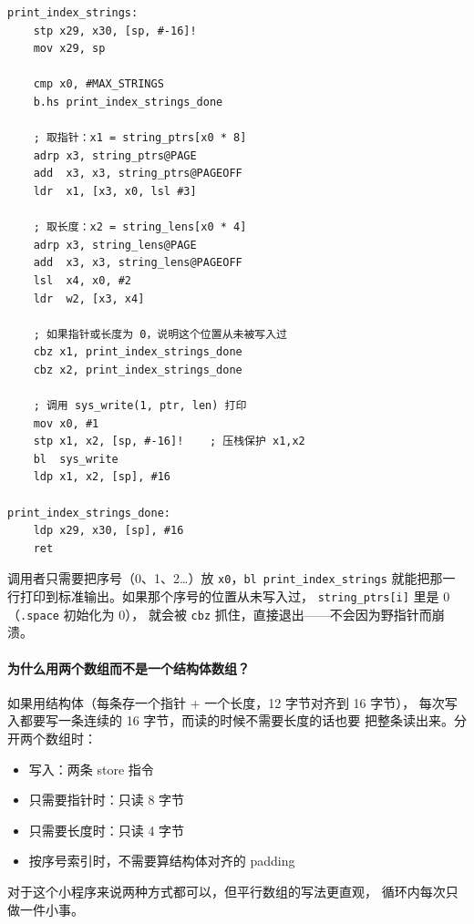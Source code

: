 \begin{lstlisting}[style=asm,caption=string\_array.s — print\_index\_strings]
print_index_strings:
    stp x29, x30, [sp, #-16]!
    mov x29, sp

    cmp x0, #MAX_STRINGS
    b.hs print_index_strings_done

    ; 取指针：x1 = string_ptrs[x0 * 8]
    adrp x3, string_ptrs@PAGE
    add  x3, x3, string_ptrs@PAGEOFF
    ldr  x1, [x3, x0, lsl #3]

    ; 取长度：x2 = string_lens[x0 * 4]
    adrp x3, string_lens@PAGE
    add  x3, x3, string_lens@PAGEOFF
    lsl  x4, x0, #2
    ldr  w2, [x3, x4]

    ; 如果指针或长度为 0，说明这个位置从未被写入过
    cbz x1, print_index_strings_done
    cbz x2, print_index_strings_done

    ; 调用 sys_write(1, ptr, len) 打印
    mov x0, #1
    stp x1, x2, [sp, #-16]!    ; 压栈保护 x1,x2
    bl  sys_write
    ldp x1, x2, [sp], #16

print_index_strings_done:
    ldp x29, x30, [sp], #16
    ret
\end{lstlisting}

调用者只需要把序号（0、1、2…）放 \texttt{x0}，\texttt{bl print\_index\_strings}
就能把那一行打印到标准输出。如果那个序号的位置从未写入过，
\texttt{string\_ptrs[i]} 里是 0（\texttt{.space} 初始化为 0），
就会被 \texttt{cbz} 抓住，直接退出——不会因为野指针而崩溃。

\paragraph{为什么用两个数组而不是一个结构体数组？}
如果用结构体（每条存一个指针 + 一个长度，12 字节对齐到 16 字节），
每次写入都要写一条连续的 16 字节，而读的时候不需要长度的话也要
把整条读出来。分开两个数组时：
\begin{itemize}
    \item 写入：两条 store 指令
    \item 只需要指针时：只读 8 字节
    \item 只需要长度时：只读 4 字节
    \item 按序号索引时，不需要算结构体对齐的 padding
\end{itemize}
对于这个小程序来说两种方式都可以，但平行数组的写法更直观，
循环内每次只做一件小事。
